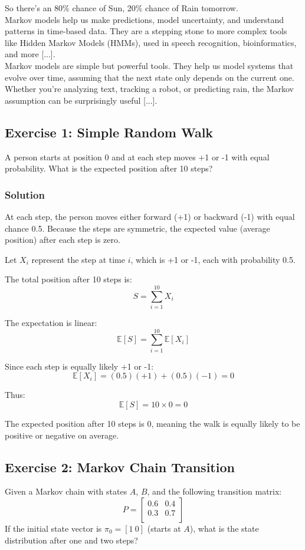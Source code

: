 \documentclass{book}
\begin{document}
So there's an 80\% chance of Sun, 20\% chance of Rain tomorrow.\\

Markov models help us make predictions, model uncertainty, and understand patterns in time-based data. They are a stepping stone to more complex tools like Hidden Markov Models (HMMs), used in speech recognition, bioinformatics, and more [...].\\

Markov models are simple but powerful tools. They help us model systems that evolve over time, assuming that the next state only depends on the current one. Whether you’re analyzing text, tracking a robot, or predicting rain, the Markov assumption can be surprisingly useful [...].

\newpage

\subsection*{Exercise 1: Simple Random Walk}
A person starts at position 0 and at each step moves +1 or -1 with equal probability. What is the expected position after 10 steps?

\subsubsection*{Solution}
At each step, the person moves either forward (+1) or backward (-1) with equal chance 0.5. Because the steps are symmetric, the expected value (average position) after each step is zero.

Let $X_i$ represent the step at time $i$, which is +1 or -1, each with probability 0.5.

The total position after 10 steps is:
\[
S = \sum_{i=1}^{10} X_i
\]

The expectation is linear:
\[
\mathbb{E}[S] = \sum_{i=1}^{10} \mathbb{E}[X_i]
\]

Since each step is equally likely +1 or -1:
\[
\mathbb{E}[X_i] = (0.5)(+1) + (0.5)(-1) = 0
\]

Thus:
\[
\mathbb{E}[S] = 10 \times 0 = 0
\]

The expected position after 10 steps is 0, meaning the walk is equally likely to be positive or negative on average.

\subsection*{Exercise 2: Markov Chain Transition}
Given a Markov chain with states $A$, $B$, and the following transition matrix:
\[
P = \begin{bmatrix}
0.6 & 0.4 \\
0.3 & 0.7 \\
\end{bmatrix}
\]
If the initial state vector is $\pi_0 = [1\ 0]$ (starts at $A$), what is the state distribution after one and two steps?
\end{document}

